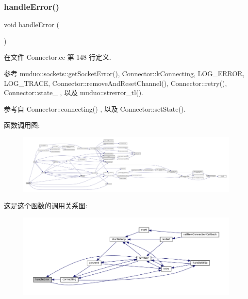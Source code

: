 \subsubsection{\texorpdfstring{handle\+Error()}{handleError()}}
{\footnotesize\ttfamily void handle\+Error (\begin{DoxyParamCaption}{ }\end{DoxyParamCaption})\hspace{0.3cm}{\ttfamily [private]}}



在文件 Connector.\+cc 第 148 行定义.



参考 muduo\+::sockets\+::get\+Socket\+Error(), Connector\+::k\+Connecting, L\+O\+G\+\_\+\+E\+R\+R\+OR, L\+O\+G\+\_\+\+T\+R\+A\+CE, Connector\+::remove\+And\+Reset\+Channel(), Connector\+::retry(), Connector\+::state\+\_\+ , 以及 muduo\+::strerror\+\_\+tl().



参考自 Connector\+::connecting() , 以及 Connector\+::set\+State().

函数调用图\+:
\nopagebreak
\begin{figure}[H]
\begin{center}
\leavevmode
\includegraphics[width=350pt]{classmuduo_1_1Connector_a70b275e63748ddd6da7d2171c540ccff_cgraph}
\end{center}
\end{figure}
这是这个函数的调用关系图\+:
\nopagebreak
\begin{figure}[H]
\begin{center}
\leavevmode
\includegraphics[width=350pt]{classmuduo_1_1Connector_a70b275e63748ddd6da7d2171c540ccff_icgraph}
\end{center}
\end{figure}
\mbox{\label{classmuduo_1_1Connector_ae1d79ff6580eaced59a900144818150d}} 

